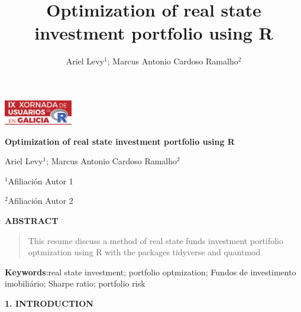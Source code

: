 \documentclass[
]{article}
\title{Optimization of real state investment portfolio using R}
\author{Ariel Levy\(^{1}\); Marcus Antonio Cardoso Ramalho\(^{2}\)}
\date{}
\begin{document}
\begin{flushright}
\includegraphics[angle=0,keepaspectratio,width=3cm]{logo.pdf}
\end{flushright}

 \vspace{20pt}

\begin{center}
\textbf{Optimization of real state investment portfolio using R}

\vspace{0.15cm}

Ariel Levy\(^{1}\); Marcus Antonio Cardoso Ramalho\(^{2}\) 
\end{center}

\vspace{0.06cm}

$^{1}$Afiliaci\'on Autor 1

$^{2}$Afiliaci\'on Autor 2

\begin{center}
\textbf{ABSTRACT}
\end{center}

\begin{quotation}
\noindent This resume discuss a method of real state funds investment
portifolio optmization using R with the packages tidyverse and quantmod
\end{quotation}

\vspace{0.4cm}

\textbf{Keywords}:real state investment; portfolio optmization; Fundos
de investimento imobiliário; Sharpe ratio; portfolio risk

\vspace{0.4cm}

\ifdefined\Shaded\renewenvironment{Shaded}{\begin{tcolorbox}[borderline west={3pt}{0pt}{shadecolor}, boxrule=0pt, enhanced, frame hidden, interior hidden, breakable, sharp corners]}{\end{tcolorbox}}\fi

\pagestyle{empty}
\setlength\parindent{0pt}

\begin{center}
\textbf{1. INTRODUCTION}
\end{center}
\end{document}
